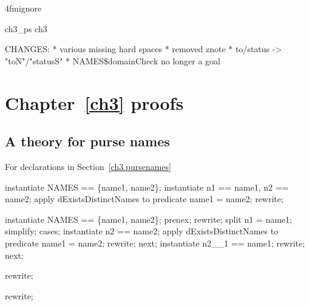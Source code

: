 \ai4fmignore{
\begin{zsection}
  \SECTION ch3\_ps \parents ch3
\end{zsection}
CHANGES:
* various missing hard spaces
* removed znote
* to/status -> "toN"/"statusS"
* NAMES\$domainCheck no longer a goal
}

\chapter{Chapter~\ref{ch3} proofs}\label{ch3.ps}

\section{A theory for purse names}

For declarations in Section~\ref{ch3.pursenames}

\begin{LPScript}\begin{zproof}[tNamesExistentialConsistency]
    instantiate NAMES == \{name1, name2\};
    instantiate n1 == name1, n2 == name2;
    apply dExistsDistinctNames to predicate name1 = name2;
    rewrite;
\end{zproof}\end{LPScript}

\begin{LPScript}\begin{zproof}[tNamesUniversalConsistency]
    instantiate NAMES == \{name1, name2\};
    prenex;
    rewrite;
    split n1 = name1;
    simplify;
    cases;
    instantiate n2 == name2;
    apply dExistsDistinctNames to predicate name1 = name2;
    rewrite;
    next;
    instantiate n2\_\_1 == name1;
    rewrite;
    next;
\end{zproof}\end{LPScript}


\begin{LPScript}\begin{zproof}[rInNames]
    rewrite;
\end{zproof}\end{LPScript}

\begin{LPScript}\begin{zproof}[rFiniteMember]
    rewrite;
\end{zproof}\end{LPScript}

